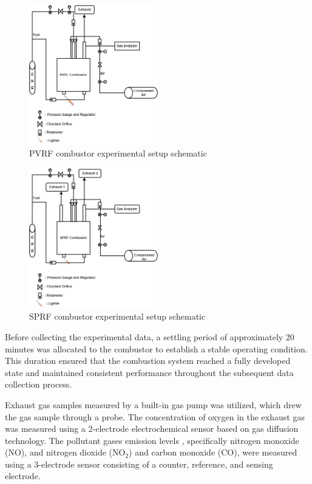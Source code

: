 \begin{figure}[h]
	\centering
	\includegraphics[width=0.5\textwidth]{Chapter4/Images/PVRF.drawio.png}
	\caption{PVRF combustor experimental setup schematic}
	\label{fig1: PVRF}
\end{figure}
\begin{figure}[h]
	\centering
	\includegraphics[width=0.5\textwidth]{Chapter4/Images/SPRF.drawio.png}
	\caption{SPRF combustor experimental setup schematic}
	\label{fig2: SPRF}
\end{figure}

Before collecting the experimental data, a settling period of approximately 20 minutes was allocated to the combustor to establish a stable operating condition. This duration ensured that the combustion system reached a fully developed state and maintained consistent performance throughout the subsequent data collection process.

Exhaust gas samples measured by a built-in gas pump was utilized, which drew the gas sample through a probe. The concentration of oxygen in the exhaust gas was measured using a 2-electrode electrochemical sensor based on gas diffusion technology. The pollutant gases emission levels , specifically nitrogen monoxide (NO), and nitrogen dioxide (NO$_2$) and carbon monoxide (CO), were measured using a 3-electrode sensor consisting of a counter, reference, and sensing electrode.


